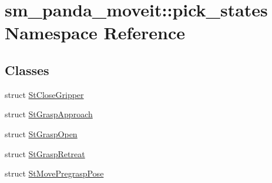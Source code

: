 \hypertarget{namespacesm__panda__moveit_1_1pick__states}{}\section{sm\+\_\+panda\+\_\+moveit\+:\+:pick\+\_\+states Namespace Reference}
\label{namespacesm__panda__moveit_1_1pick__states}
\subsection*{Classes}
\begin{DoxyCompactItemize}
\item 
struct \hyperlink{structsm__panda__moveit_1_1pick__states_1_1StCloseGripper}{St\+Close\+Gripper}
\item 
struct \hyperlink{structsm__panda__moveit_1_1pick__states_1_1StGraspApproach}{St\+Grasp\+Approach}
\item 
struct \hyperlink{structsm__panda__moveit_1_1pick__states_1_1StGraspOpen}{St\+Grasp\+Open}
\item 
struct \hyperlink{structsm__panda__moveit_1_1pick__states_1_1StGraspRetreat}{St\+Grasp\+Retreat}
\item 
struct \hyperlink{structsm__panda__moveit_1_1pick__states_1_1StMovePregraspPose}{St\+Move\+Pregrasp\+Pose}
\end{DoxyCompactItemize}
